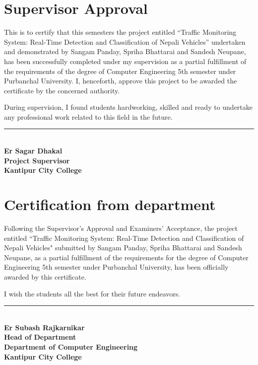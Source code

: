 \documentclass[12pt,a4paper]{report}
\begin{document}
\newpage
\chapter*{Supervisor Approval}

This is to certify that this semesters  the project entitled “Traffic Monitoring System: Real-Time Detection and Classification of Nepali Vehicles” undertaken and demonstrated by Sangam Panday, Spriha Bhattarai and Sandesh Neupane, has been successfully completed under my supervision as a partial fulfillment of the requirements of the degree of Computer Engineering 5th semester under Purbanchal University. I, henceforth, approve this project to be awarded the certificate by the concerned authority. 

During supervision, I found students hardworking, skilled and ready to undertake any professional work related to this field in the future.


\vspace{4cm}
\noindent
\begin{minipage}{0.5\textwidth}
  \rule{5cm}{0.4pt}\\ [0.2cm]
  \textbf{Er Sagar Dhakal}\\
  \textbf{Project Supervisor}\\
  \textbf{Kantipur City College}
\end{minipage}


\newpage

\chapter*{Certification from department}

Following the Supervisor's Approval and Examiners' Acceptance, the project entitled “Traffic Monitoring System: Real-Time Detection and Classification of Nepali Vehicles" submitted by Sangam Panday, Spriha Bhattarai and Sandesh Neupane, as a partial fulfillment of the requirements for the degree of Computer Engineering 5th semester under Purbanchal University, has been officially awarded by this certificate.

 I wish the students all the best for their future endeavors.



\vspace{4cm}
\noindent
\begin{minipage}{0.8\textwidth}
  \rule{5cm}{0.4pt}\\ [0.2cm]
  \textbf{Er Subash Rajkarnikar}\\
  \textbf{Head of Department}\\
  \textbf{Department of Computer Engineering}\\
  \textbf{Kantipur City College}
\end{minipage}
\end{document}
